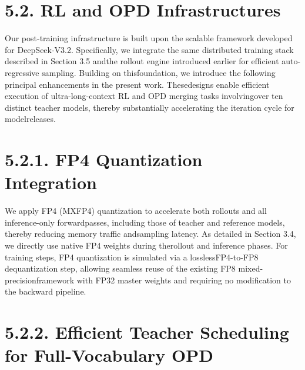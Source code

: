\documentclass[
  10
]{article}
\begin{document}
\section{5.2. RL and OPD
Infrastructures}\label{rl-and-opd-infrastructures}

Our post-training infrastructure is built upon the scalable framework
developed for DeepSeek-V3.2. Specifically, we integrate the same
distributed training stack described in Section 3.5 andthe rollout
engine introduced earlier for efficient auto-regressive sampling.
Building on thisfoundation, we introduce the following principal
enhancements in the present work. Thesedesigns enable efficient
execution of ultra-long-context RL and OPD merging tasks involvingover
ten distinct teacher models, thereby substantially accelerating the
iteration cycle for modelreleases.

\section{5.2.1. FP4 Quantization
Integration}\label{fp4-quantization-integration}

We apply FP4 (MXFP4) quantization to accelerate both rollouts and all
inference-only forwardpasses, including those of teacher and reference
models, thereby reducing memory traffic andsampling latency. As detailed
in Section 3.4, we directly use native FP4 weights during therollout and
inference phases. For training steps, FP4 quantization is simulated via
a losslessFP4-to-FP8 dequantization step, allowing seamless reuse of the
existing FP8 mixed-precisionframework with FP32 master weights and
requiring no modification to the backward pipeline.

\section{5.2.2. Efficient Teacher Scheduling for Full-Vocabulary
OPD}\label{efficient-teacher-scheduling-for-full-vocabulary-opd}
\end{document}

